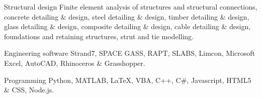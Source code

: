 

\begin{cvskills}

  \cvskill
    {Structural design} %
    {Finite element analysis of structures and structural connections, concrete detailing \& design, steel detailing \newline \& design, timber detailing \& design, glass detailing \& design, composite detailing \& design, cable detailing \& \newline design, foundations and retaining structures, strut and tie modelling.} %

  \cvskill
    {Engineering software} %
    {Strand7, SPACE GASS, RAPT, SLABS, Limcon, Microsoft Excel, AutoCAD, Rhinoceros \& Grasshopper.} %

  \cvskill
    {Programming} %
    {Python, MATLAB, \LaTeX, VBA, C++, C\#, Javascript, HTML5 \& CSS, Node.js.} %

\end{cvskills}
